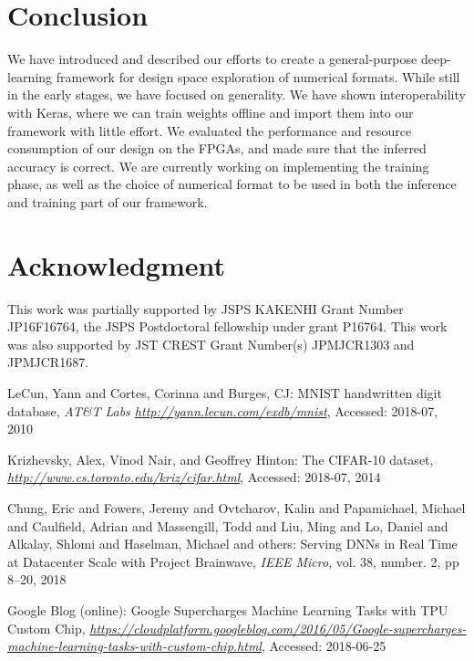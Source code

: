 \documentclass[techrep,english]{ipsj} %
\begin{document}
{\section{Conclusion}\label{sec:conclusion}
We have introduced and described our efforts to create a general-purpose deep-learning framework for design space exploration of numerical formats.
While still in the early stages, we have focused on generality.
We have shown interoperability with Keras, where we can train weights offline and import them into our framework with little effort.
We evaluated the performance and resource consumption of our design on the FPGAs, and made sure that the inferred accuracy is correct.
We are currently working on implementing the training phase, as well as the choice of numerical format to be used in both the inference and training part of our framework.


\section{Acknowledgment}\label{sec:acknowledgment}
This work was partially supported by JSPS KAKENHI Grant Number JP16F16764, the JSPS Postdoctoral fellowship under grant P16764.
This work was also supported by JST CREST Grant Number(s) JPMJCR1303 and JPMJCR1687.

\begin{thebibliography}{99}

  LeCun, Yann and Cortes, Corinna and Burges, CJ:
  MNIST handwritten digit database,
  {\it AT\&T Labs \url{http://yann.lecun.com/exdb/mnist}},
  Accessed: 2018-07, 2010

  Krizhevsky, Alex, Vinod Nair, and Geoffrey Hinton:
  The CIFAR-10 dataset,
  {\it \url{http://www.cs.toronto.edu/kriz/cifar.html}},
  Accessed: 2018-07, 2014

  Chung, Eric and Fowers, Jeremy and Ovtcharov, Kalin and Papamichael, Michael and Caulfield, Adrian and Massengill, Todd and Liu, Ming and Lo, Daniel and Alkalay, Shlomi and Haselman, Michael and others:
  Serving DNNs in Real Time at Datacenter Scale with Project Brainwave,
  {\it IEEE Micro},
  vol. 38, number. 2, pp 8--20, 2018

  Google Blog (online):
  Google Supercharges Machine Learning Tasks with TPU Custom Chip,
  {\it \url{https://cloudplatform.googleblog.com/2016/05/Google-supercharges-machine-learning-tasks-with-custom-chip.html}},
  Accessed: 2018-06-25


\end{thebibliography}}
\end{document}
